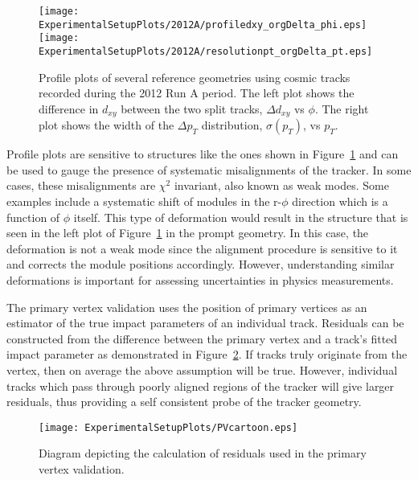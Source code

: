 \begin{figure}
\begin{center}
\texttt{[image: ExperimentalSetupPlots/2012A/profiledxy\_orgDelta\_phi.eps]}
\texttt{[image: ExperimentalSetupPlots/2012A/resolutionpt\_orgDelta\_pt.eps]}
\caption{Profile plots of several reference geometries using cosmic tracks
recorded during the 2012 Run A period.  The left plot shows the difference 
in $d_{xy}$ between the two split tracks, $\Delta d_{xy}$ vs $\phi$.  The 
right plot shows the width of the $\Delta p_T$ distribution, $\sigma(p_T)$, 
vs $p_T$.}
\label{fig:trackSplittingProfiles}
\end{center}
\end{figure}

Profile plots are sensitive to structures like the ones shown in 
Figure~\ref{fig:trackSplittingProfiles} and can be used to gauge
the presence of systematic misalignments of the tracker. In some 
cases, these misalignments are $\chi^2$ invariant, also known
as weak modes.  Some examples include a systematic shift of modules
in the r-$\phi$ direction which is a function of $\phi$ itself.  
This  type of deformation would result in the structure that is 
seen in the left plot of Figure~\ref{fig:trackSplittingProfiles}
in the prompt geometry.  In this case, the deformation is not a
weak mode since the alignment procedure is sensitive to it and
corrects the module positions accordingly.  However, understanding
similar deformations is important for assessing uncertainties in
physics measurements.  


The primary vertex validation uses the position of primary vertices as
an estimator of the true impact parameters of an individual track.  
Residuals can be constructed from the difference between the primary 
vertex and a track's fitted impact parameter as demonstrated in 
Figure~\ref{fig:PVcartoon}.    If tracks truly originate from 
the vertex, then on average the above assumption
will be true.  However, individual tracks which pass through poorly 
aligned regions of the tracker will give larger residuals, thus providing
a self consistent probe of the tracker geometry.  

\begin{figure}
\begin{center}
\texttt{[image: ExperimentalSetupPlots/PVcartoon.eps]}
\caption{Diagram depicting the calculation of residuals used in 
the primary vertex validation.}
\label{fig:PVcartoon}
\end{center}
\end{figure}

